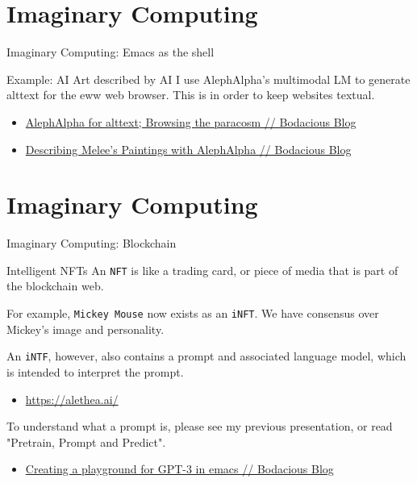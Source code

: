 \documentclass[presentation]{beamer}
\begin{document}
\section{Imaginary Computing}
\label{sec:org36a81ab}
\begin{frame}[label={sec:orge3c705a}]{Imaginary Computing: Emacs as the shell}
\begin{block}{Example: AI Art described by AI}
I use AlephAlpha’s multimodal LM to generate
alttext for the eww web browser. This is in
order to keep websites textual.

\begin{itemize}
\item \href{https://mullikine.github.io/posts/alephalpha-for-alttext/}{AlephAlpha for alttext; Browsing the paracosm // Bodacious Blog}
\item \href{https://mullikine.github.io/posts/describing-melee-s-paintings-with-alephalpha/}{Describing Melee's Paintings with AlephAlpha // Bodacious Blog}
\end{itemize}
\end{block}
\end{frame}

\section{Imaginary Computing}
\label{sec:orgafac164}
\begin{frame}[label={sec:org5bef097},fragile]{Imaginary Computing: Blockchain}
 \begin{block}{Intelligent NFTs}
An \texttt{NFT} is like a trading card, or piece of media that is part of the blockchain web.

For example, \texttt{Mickey Mouse} now exists as an
\texttt{iNFT}. We have consensus over Mickey's image
and personality.

An \texttt{iNTF}, however, also contains a prompt and associated language model, which is intended to interpret the prompt.
\begin{itemize}
\item \url{https://alethea.ai/}
\end{itemize}

To understand what a prompt is, please see my
previous presentation, or read "Pretrain,
Prompt and Predict".

\begin{itemize}
\item \href{https://mullikine.github.io/posts/creating-a-playground-for-gpt-3-in-emacs/}{Creating a playground for GPT-3 in emacs // Bodacious Blog}
\end{itemize}
\end{block}
\end{frame}
\end{document}
